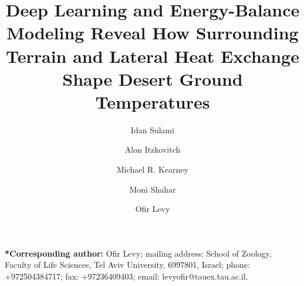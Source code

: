 \documentclass[12pt]{article}
\date{}
\begin{document}
\title{\normalsize\textbf {Deep Learning and Energy-Balance Modeling Reveal How Surrounding Terrain and Lateral Heat Exchange Shape Desert Ground Temperatures}}

\author[1]{\normalsize Idan Sulami}
\author[1]{\normalsize Alon Itzkovitch}
\author[2]{\normalsize Michael R. Kearney}
\author[3]{\normalsize Moni Shahar}
\author[1,*]{\normalsize Ofir Levy}


\maketitle 

\noindent \textbf{*Corresponding author:} Ofir Levy; mailing address: School of Zoology, Faculty of Life Sciences, Tel Aviv University, 6997801, Israel; phone: +972504384717; fax: +97236409403; email: levyofir@tauex.tau.ac.il.
\end{document}
